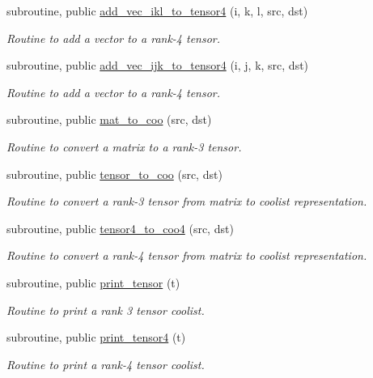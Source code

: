 \begin{DoxyCompactItemize}
subroutine, public \hyperlink{namespacetensor_a4dd51ee85d6dffa3350880defc9823e8}{add\+\_\+vec\+\_\+ikl\+\_\+to\+\_\+tensor4} (i, k, l, src, dst)
\begin{DoxyCompactList}\small\item\em Routine to add a vector to a rank-\/4 tensor. \end{DoxyCompactList}\item 
subroutine, public \hyperlink{namespacetensor_adfadc0660ec0e87b9d0dd3c383919d6b}{add\+\_\+vec\+\_\+ijk\+\_\+to\+\_\+tensor4} (i, j, k, src, dst)
\begin{DoxyCompactList}\small\item\em Routine to add a vector to a rank-\/4 tensor. \end{DoxyCompactList}\item 
subroutine, public \hyperlink{namespacetensor_a75d1a9ca8b39e9ad4b151a7b4b45c70f}{mat\+\_\+to\+\_\+coo} (src, dst)
\begin{DoxyCompactList}\small\item\em Routine to convert a matrix to a rank-\/3 tensor. \end{DoxyCompactList}\item 
subroutine, public \hyperlink{namespacetensor_a39f5944ef78c2d2aaac59477d8c6848f}{tensor\+\_\+to\+\_\+coo} (src, dst)
\begin{DoxyCompactList}\small\item\em Routine to convert a rank-\/3 tensor from matrix to coolist representation. \end{DoxyCompactList}\item 
subroutine, public \hyperlink{namespacetensor_ae8308730212d86ee401775f02f631310}{tensor4\+\_\+to\+\_\+coo4} (src, dst)
\begin{DoxyCompactList}\small\item\em Routine to convert a rank-\/4 tensor from matrix to coolist representation. \end{DoxyCompactList}\item 
subroutine, public \hyperlink{namespacetensor_a5747516cd8a6fc9079fbb82d1b18dd98}{print\+\_\+tensor} (t)
\begin{DoxyCompactList}\small\item\em Routine to print a rank 3 tensor coolist. \end{DoxyCompactList}\item 
subroutine, public \hyperlink{namespacetensor_acb57d076f51b89419e4e8254ce13dd62}{print\+\_\+tensor4} (t)
\begin{DoxyCompactList}\small\item\em Routine to print a rank-\/4 tensor coolist. \end{DoxyCompactList}\item 

\end{DoxyCompactItemize}

